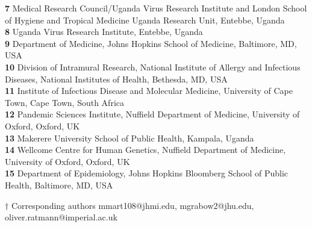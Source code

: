 \documentclass[10pt,letterpaper]{article}
\begin{document}
\begin{flushleft}
\textbf{7} Medical Research Council/Uganda Virus Research Institute and London School of Hygiene and Tropical Medicine Uganda Research Unit, Entebbe, Uganda \\

\textbf{8} Uganda Virus Research Institute, Entebbe, Uganda \\

\textbf{9} Department of Medicine, Johns Hopkins School of Medicine, Baltimore, MD, USA
\\
\textbf{10} Division of Intramural Research, National Institute of Allergy and Infectious Diseases, National Institutes of Health, Bethesda, MD, USA
\\
\textbf{11} Institute of Infectious Disease and Molecular Medicine, University of Cape Town, Cape Town, South Africa
\\
\textbf{12} Pandemic Sciences Institute, Nuffield Department of Medicine, University of Oxford, Oxford, UK \\

\textbf{13} Makerere University School of Public Health, Kampala, Uganda \\

\textbf{14} Wellcome Centre for Human Genetics, Nuffield Department of Medicine, University of Oxford, Oxford, UK \\

\textbf{15} Department of Epidemiology, Johns Hopkins Bloomberg School of Public Health, Baltimore, MD, USA \\
\bigskip

$\dagger$ Corresponding authors mmart108@jhmi.edu, mgrabow2@jhu.edu, oliver.ratmann@imperial.ac.uk 
\end{flushleft}
\newpage
\listoffigures
\newpage
\end{document}
